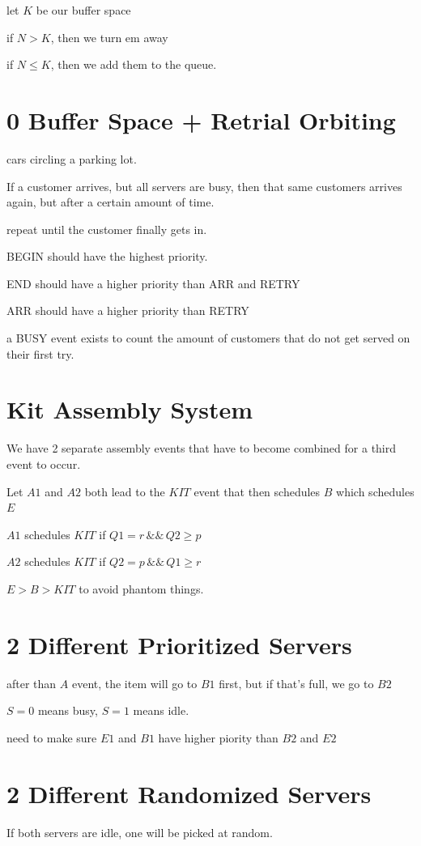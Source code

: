 \documentclass[fleqn]{report}
\begin{document}
let $K$ be our buffer space 

if $N > K$, then we turn em away 

if $N \leq K$, then we add them to the queue. 

\section{0 Buffer Space + Retrial Orbiting}
cars circling a parking lot. 

If a customer arrives, but all servers are busy, then 
that same customers arrives again, but after a certain amount of time. 

repeat until the customer finally gets in. 

BEGIN should have the highest priority.

END should have a higher priority than ARR and RETRY

ARR should have a higher priority than RETRY 

a BUSY event exists to count the amount of customers that do not 
get served on their first try. 


\section{Kit Assembly System}
We have 2 separate assembly events that have to become 
combined for a third event to occur. 

Let $A1$ and $A2$ both lead to the $KIT$ event that 
then schedules $B$ which schedules $E$

$A1$ schedules $KIT$ if $Q1 = r \, \&\& \, Q2 \geq p$ 

$A2$ schedules $KIT$ if $Q2 = p \, \&\& \, Q1 \geq r$ 

$E > B > KIT$ to avoid phantom things.

\section{2 Different Prioritized Servers}
after than $A$ event, the item will go to $B1$ first, but if that's 
full, we go to $B2$

$S = 0$ means busy, $S = 1$ means idle. 

need to make sure $E1$ and $B1$ have higher piority than $B2$ and $E2$


\section{2 Different Randomized Servers}
If both servers are idle, one will be picked at random. 
\end{document}

